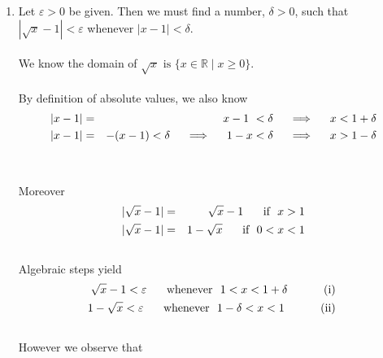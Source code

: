 \documentclass[12pt]{amsart}
\begin{document}
\begin{enumerate}
\begin{enumerate}
		\end{enumerate}
		\bigskip
	\item 
		Let $\varepsilon>0$ be given.  Then we must find a number, $\delta>0$, such that 
		$|\sqrt{x}-1|<\varepsilon$ whenever $|x-1|<\delta$.\\
		\\
		We know the domain of $\sqrt{x} \text{ is } \{x \in \mathbb{R} \mid x \ge 0\}$.\\
		\\
		By definition of absolute values, we also know
			\begin{eqnarray}
				|x-1| & = & \hspace{0.5cm} x-1 \text{ } < \delta \hspace{0.5cm} \Longrightarrow 							\hspace{0.5cm} x < 1 + \delta \nonumber \\
				|x-1| & = & -(x-1) < \delta \hspace{0.5cm} \Longrightarrow \hspace{0.5cm} 
				1 - x < \delta \hspace{0.5cm} \Longrightarrow \hspace{0.5cm} 
				x > 1- \delta \nonumber
			\end{eqnarray}\\
		\\
		Moreover
			\begin{eqnarray}
				|\sqrt{x}-1| & = & \sqrt{x}-1 \hspace{0.5cm} \text{ if } \text { } x > 1\nonumber \\
				|\sqrt{x}-1| & = & 1- \sqrt{x} \hspace{0.5cm} \text{ if } \text { } 0 < x < 1\nonumber
			\end{eqnarray}\\
		Algebraic steps yield\\
			\begin{eqnarray}
				\sqrt{x}-1 < \varepsilon \hspace{0.5cm} \text{ whenever } \text{ } 1<  x < 1+\delta
				\hspace{1cm} \text { (i) } \nonumber \\
				1- \sqrt{x} < \varepsilon \hspace{0.5cm} \text{ whenever } \text{ } 1- \delta < x < 1 
				\hspace{1cm} \text { (ii) } \nonumber
			\end{eqnarray}\\
		However we observe that\\

\end{enumerate}
\end{document}
